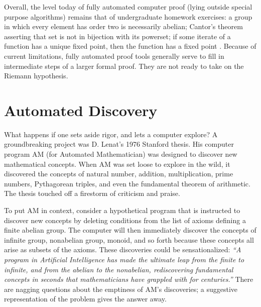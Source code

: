 \documentclass{llncs}
\begin{document}
\bigskip


Overall, the level today of fully automated computer proof (lying outside
special purpose algorithms) remains that of undergraduate
homework exercises: a group in which every element has order two is necessarily abelian; Cantor's theorem asserting that set is not in bijection with its powerset; 
%
if some iterate of a function has a unique fixed point, then
the function has a fixed point \cite{TPS}.
Because of current limitations, fully automated proof tools
generally serve to fill in  intermediate steps of a
larger formal proof.  They are not ready to take on the Riemann hypothesis.


\section{Automated Discovery}

What happens if one sets aside rigor, and lets a computer explore?
A groundbreaking project was D. Lenat's 1976 Stanford thesis.
His computer program AM (for Automated Mathematician) was
designed to discover new mathematical concepts.  When AM was set loose to explore in the wild, it discovered the concepts of natural number, addition, multiplication, prime numbers, Pythagorean triples, and even the fundamental theorem of arithmetic.
The thesis touched off a firestorm of criticism and praise.

To put AM in context, consider a hypothetical program that is instructed to discover new concepts by deleting conditions
from the list of axioms defining a finite abelian group.  The computer will then immediately discover the concepts
of infinite  group,  nonabelian group,  monoid, and so forth because these concepts all
arise as subsets of the axioms.  These discoveries could be sensationalized:
{\it ``A program in Artificial Intelligence 
has made the ultimate leap from the finite to infinite, and from the abelian to the nonabelian,
rediscovering fundamental concepts in seconds that mathematicians have grappled with for centuries.''}
There are nagging questions about the emptiness of AM's discoveries; a
suggestive representation of the problem gives the answer away.
\end{document}
